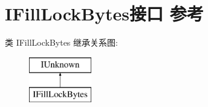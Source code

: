 \hypertarget{interface_i_fill_lock_bytes}{}\section{I\+Fill\+Lock\+Bytes接口 参考}
\label{interface_i_fill_lock_bytes}
类 I\+Fill\+Lock\+Bytes 继承关系图\+:\begin{figure}[H]
\begin{center}
\leavevmode
\includegraphics[height=2.000000cm]{interface_i_fill_lock_bytes}
\end{center}
\end{figure}
